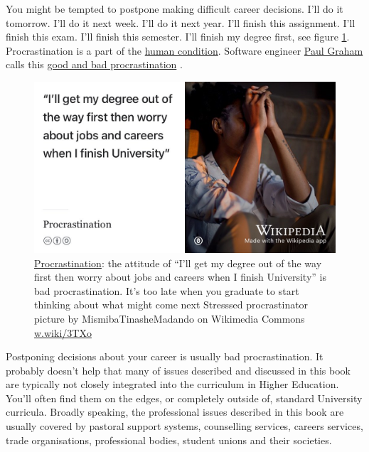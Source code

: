 \documentclass[
]{book}
\begin{document}
You might be tempted to postpone making difficult career decisions. I'll do it tomorrow. I'll do it next week. I'll do it next year. I'll finish this assignment. I'll finish this exam. I'll finish this semester. I'll finish my degree first, see figure \ref{fig:procrastination-fig}. Procrastination is a part of the \href{https://en.wikipedia.org/wiki/Human_condition}{human condition}. Software engineer \href{https://en.wikipedia.org/wiki/Paul_Graham_(programmer)}{Paul Graham} calls this \href{http://paulgraham.com/procrastination.html}{good and bad procrastination} \citep{procrastination}.

\begin{figure}

{\centering \includegraphics[width=0.99\linewidth]{images/procrastinator} 

}

\caption{\href{https://en.wikipedia.org/wiki/Procrastination}{Procrastination}: the attitude of ``I'll get my degree out of the way first then worry about jobs and careers when I finish University'' is bad procrastination. It's too late when you graduate to start thinking about what might come next \citep{procrastination} Stresssed procrastinator picture by MismibaTinasheMadando on Wikimedia Commons \href{https://w.wiki/3TXo}{w.wiki/3TXo}}\label{fig:procrastination-fig}
\end{figure}



Postponing decisions about your career is usually bad procrastination. It probably doesn't help that many of issues described and discussed in this book are typically not closely integrated into the curriculum in Higher Education. You'll often find them on the edges, or completely outside of, standard University curricula. Broadly speaking, the professional issues described in this book are usually covered by pastoral support systems, counselling services, careers services, trade organisations, professional bodies, student unions and their societies.
\end{document}
